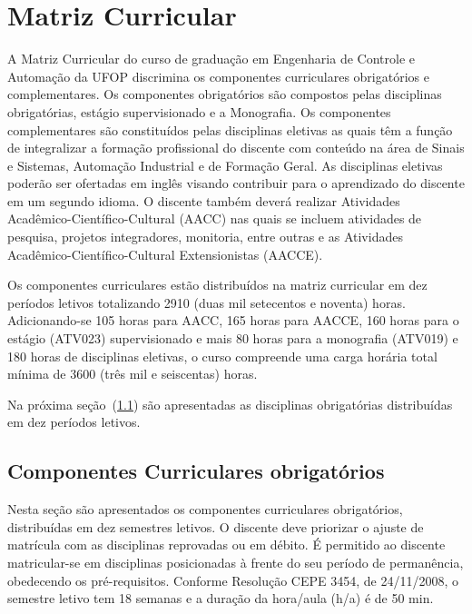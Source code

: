 \documentclass[
	12pt,				%
	openright,			%
	oneside,			%
	a4paper,			%
	english,			%
	brazil				%
	]{abntex2}
\begin{document}
\section{Matriz Curricular} \label{sec:matriz}

A Matriz Curricular do curso de graduação em Engenharia de Controle e Automação da UFOP discrimina os componentes curriculares obrigatórios e complementares. Os componentes obrigatórios são compostos pelas disciplinas obrigatórias, estágio supervisionado e a Monografia. Os componentes complementares são constituídos pelas disciplinas eletivas as quais têm a função de integralizar a formação profissional do discente com conteúdo na área de Sinais e Sistemas, Automação Industrial e de Formação Geral. As disciplinas eletivas poderão ser ofertadas em inglês visando contribuir para o aprendizado do discente em um segundo idioma. O discente também deverá realizar Atividades Acadêmico-Científico-Cultural (AACC) nas quais se incluem atividades de pesquisa, projetos integradores, monitoria, entre outras e as Atividades Acadêmico-Científico-Cultural Extensionistas (AACCE).

Os componentes curriculares estão distribuídos na matriz curricular em dez períodos letivos totalizando 2910 (duas mil setecentos e noventa) horas. Adicionando-se 105 horas para AACC, 165 horas para AACCE, 160 horas para o estágio (ATV023) supervisionado e mais 80 horas para a monografia (ATV019) e 180 horas de disciplinas eletivas, o curso compreende uma carga horária total mínima de 3600 (três mil e seiscentas) horas.

%
Na próxima seção~(\ref{tab:0402}) são apresentadas as disciplinas obrigatórias distribuídas em dez períodos letivos.

\subsection{Componentes Curriculares obrigatórios}\label{tab:0402}

Nesta seção são apresentados os componentes curriculares obrigatórios, distribuídas em dez semestres letivos. O discente deve priorizar o ajuste de matrícula com as disciplinas reprovadas ou em débito. É permitido ao discente matricular-se em disciplinas posicionadas à frente do seu período de permanência, obedecendo os pré-requisitos. Conforme Resolução CEPE 3454, de 24/11/2008, o semestre letivo tem 18 semanas e a duração da hora/aula (h/a) é de 50 min.


\end{document}
